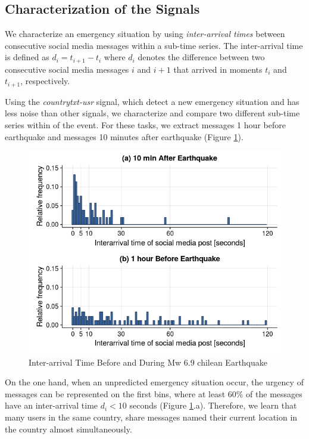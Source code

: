 \documentclass[letterpaper]{article} %
\begin{document}
\subsection{Characterization of the Signals}

We characterize an emergency situation by using \textit{inter-arrival times} between consecutive social media messages within a sub-time series. The inter-arrival time is defined as $d_{i} = t_{i+1} - t_{i}$ where $d_{i}$ denotes the difference between two consecutive social media messages $i$ and $i+1$ that arrived in moments $t_{i}$ and $t_{i+1}$, respectively.

Using the \textit{countrytxt-usr} signal, which detect a new emergency situation and has less noise than other signals, we characterize and compare two different sub-time series within of the event. For these tasks, we extract messages 1 hour before earthquake and messages 10 minutes after earthquake (Figure \ref{interarrival}). 
\begin{figure}[h]
	\centering
	\includegraphics[width=\columnwidth]{img/interarrival.png}
	\caption{Inter-arrival Time Before and During Mw 6.9 chilean Earthquake}
	\label{interarrival}
\end{figure}

On the one hand, when an unpredicted emergency situation occur, the urgency of messages can be represented on the first bins, where at least $60\%$ of the messages have an inter-arrival time $d_{i} < 10$ seconds (Figure \ref{interarrival}.a). Therefore, we learn that many users in the same country, share messages named their current location in the country almost simultaneously.
\end{document}

